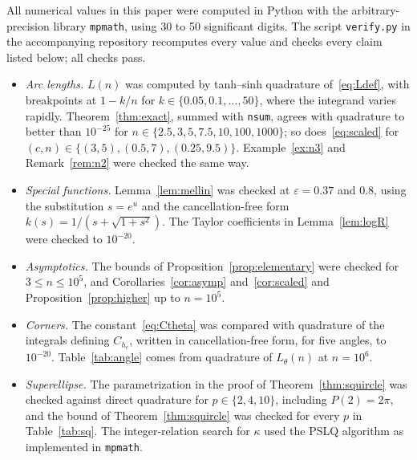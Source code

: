 \documentclass[journal]{IEEEtran}
\newcommand{\eps}{\varepsilon}
\begin{document}
All numerical values in this paper were computed in Python with the arbitrary-precision library
\texttt{mpmath}, using 30 to 50 significant digits. The script \texttt{verify.py} in the
accompanying repository recomputes every value and checks every claim listed below; all checks
pass.
\begin{itemize}
\item \emph{Arc lengths.} $L(n)$ was computed by tanh--sinh quadrature of~\eqref{eq:Ldef}, with
  breakpoints at $1-k/n$ for $k\in\{0.05,0.1,\dots,50\}$, where the integrand varies rapidly.
  Theorem~\ref{thm:exact}, summed with \texttt{nsum}, agrees with quadrature to better than
  $10^{-25}$ for $n\in\{2.5,3,5,7.5,10,100,1000\}$; so does~\eqref{eq:scaled} for
  $(c,n)\in\{(3,5),(0.5,7),(0.25,9.5)\}$. Example~\ref{ex:n3} and Remark~\ref{rem:n2} were checked
  the same way.
\item \emph{Special functions.} Lemma~\ref{lem:mellin} was checked at $\eps=0.37$ and $0.8$,
  using the substitution $s=e^u$ and the cancellation-free form $k(s)=1/(s+\sqrt{1+s^2})$. The
  Taylor coefficients in Lemma~\ref{lem:logR} were checked to $10^{-20}$.
\item \emph{Asymptotics.} The bounds of Proposition~\ref{prop:elementary} were checked for
  $3\le n\le10^5$, and Corollaries~\ref{cor:asymp} and~\ref{cor:scaled} and
  Proposition~\ref{prop:higher} up to $n=10^5$.
\item \emph{Corners.} The constant~\eqref{eq:Ctheta} was compared with quadrature of the integrals
  defining $C_{h_c}$, written in cancellation-free form, for five angles, to $10^{-20}$.
  Table~\ref{tab:angle} comes from quadrature of $L_\theta(n)$ at $n=10^6$.
\item \emph{Superellipse.} The parametrization in the proof of Theorem~\ref{thm:squircle} was
  checked against direct quadrature for $p\in\{2,4,10\}$, including $P(2)=2\pi$, and the bound
  of Theorem~\ref{thm:squircle} was checked for every $p$ in Table~\ref{tab:sq}. The
  integer-relation search for $\kappa$ used the PSLQ algorithm as implemented in
  \texttt{mpmath}.
\end{itemize}
\end{document}
